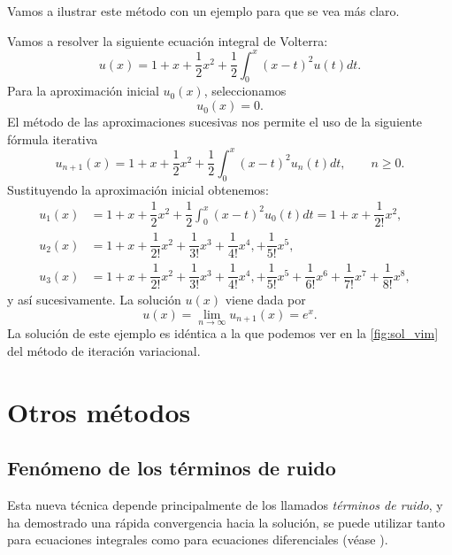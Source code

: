 Vamos a ilustrar este método con un ejemplo para que se vea más claro.
\begin{ejemplo}
	Vamos a resolver la siguiente ecuación integral de Volterra:
	\begin{equation}
		u(x) = 1 + x + \dfrac{1}{2}x^2 + \dfrac{1}{2}\int_{0}^{x}(x-t)^2u(t)dt.
	\end{equation}
	Para la aproximación inicial $u_0(x)$, seleccionamos
	\begin{equation}
		u_0(x) = 0.
	\end{equation}
	El método de las aproximaciones sucesivas nos permite el uso de la siguiente fórmula iterativa
	\begin{equation}
		u_{n+1}(x) = 1 + x + \dfrac{1}{2}x^2 + \dfrac{1}{2}\int_{0}^{x}(x-t)^2u_n(t)dt, \qquad n \geqslant 0.
	\end{equation}
	Sustituyendo la aproximación inicial obtenemos:
	\begin{align}
		u_1(x) &= 1 + x + \dfrac{1}{2}x^2 + \dfrac{1}{2}\int_{0}^{x}(x-t)^2u_0(t)dt = 1 + x + \dfrac{1}{2!}x^2,   & \\
		u_2(x) &= 1 + x + \dfrac{1}{2!}x^2 + \dfrac{1}{3!}x^3 + \dfrac{1}{4!}x^4, + \dfrac{1}{5!}x^5,   & \\
		u_3(x) &= 1 + x + \dfrac{1}{2!}x^2 + \dfrac{1}{3!}x^3 + \dfrac{1}{4!}x^4, + \dfrac{1}{5!}x^5 + \dfrac{1}{6!}x^6 + \dfrac{1}{7!}x^7 + \dfrac{1}{8!}x^8,     &
	\end{align}
	y así sucesivamente. La solución $u(x)$ viene dada por
	\begin{equation}
		u(x) = \lim_{n \rightarrow \infty} u_{n+1}(x) = e^x.
	\end{equation}
	La solución de este ejemplo es idéntica a la que podemos ver en la \autoref{fig:sol_vim} del método de iteración variacional.
\end{ejemplo}

\section{Otros métodos}

\subsection{Fenómeno de los términos de ruido}
Esta nueva técnica depende principalmente de los llamados \textit{términos de ruido}, y ha demostrado una rápida convergencia hacia la solución, se puede utilizar tanto para ecuaciones integrales como para ecuaciones diferenciales (véase \cite{WazWaz}).


